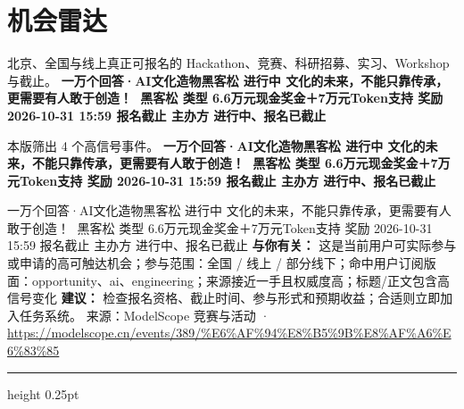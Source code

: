 \documentclass[10.5pt]{ctexart}
\begin{document}
\section*{机会雷达}
{\color{ormuted} 北京、全国与线上真正可报名的 Hackathon、竞赛、科研招募、实习、Workshop 与截止。}
\vspace{2mm}
{\LARGE\bfseries 一万个回答·AI文化造物黑客松 进行中 文化的未来，不能只靠传承，更需要有人敢于创造！👋 黑客松 类型 6.6万元现金奖金＋7万元Token支持 奖励 2026-10-31 15:59 报名截止 主办方 进行中、报名已截止}\par
\vspace{1mm}
{\color{ormuted} 本版筛出 4 个高信号事件。}
\vspace{3mm}
{\Large\bfseries 一万个回答·AI文化造物黑客松 进行中 文化的未来，不能只靠传承，更需要有人敢于创造！👋 黑客松 类型 6.6万元现金奖金＋7万元Token支持 奖励 2026-10-31 15:59 报名截止 主办方 进行中、报名已截止}\par
一万个回答·AI文化造物黑客松 进行中 文化的未来，不能只靠传承，更需要有人敢于创造！👋 黑客松 类型 6.6万元现金奖金＋7万元Token支持 奖励 2026-10-31 15:59 报名截止 主办方 进行中、报名已截止
\textbf{与你有关：} 这是当前用户可实际参与或申请的高可触达机会；参与范围：全国 / 线上 / 部分线下；命中用户订阅版面：opportunity、ai、engineering；来源接近一手且权威度高；标题/正文包含高信号变化
\textbf{建议：} 检查报名资格、截止时间、参与形式和预期收益；合适则立即加入任务系统。
{\footnotesize\color{ormuted} 来源：ModelScope 竞赛与活动 · \url{https://modelscope.cn/events/389/%E6%AF%94%E8%B5%9B%E8%AF%A6%E6%83%85}}
\vspace{4mm}
\hrule height 0.25pt
\vspace{3mm}
\end{document}

